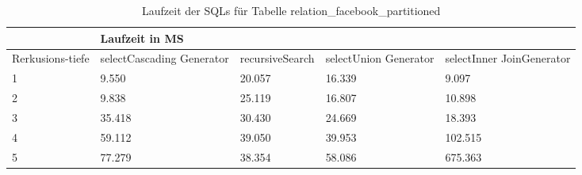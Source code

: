 \begin{table}[H]
	\centering
	\begin{tabular}{l|l|l|l|l|l|}
		\cline{2-6}
		& \multicolumn{5}{|l|}{Laufzeit in MS}                                                                                                                                                  \\ \hline
		\multicolumn{1}{|l|}{\multirow{2}{2cm}{Rerkusions-tiefe}} & \multicolumn{2}{|l|}{\multirow{2}{3cm}{selectCascading Generator}} & \multirow{2}{2.8cm}{recursiveSearch} & \multirow{2}{2.5cm}{selectUnion Generator} & \multirow{2}{2.5cm}{selectInner JoinGenerator} \\
		\multicolumn{1}{|l|}{}
		& \multicolumn{2}{|l|}{}                                           &                                  &                                     &                                           \\ \hline
		
\multicolumn{1}{|l|}{1}                                 & \multicolumn{2}{l|}{9.550}                                       & 20.057                                                & 16.339                                                    & 9.097                                                           \\ \hline
\multicolumn{1}{|l|}{2}                                 & \multicolumn{2}{l|}{9.838}                                       & 25.119                                                & 16.807                                                    & 10.898                                                          \\ \hline
\multicolumn{1}{|l|}{3}                                 & \multicolumn{2}{l|}{35.418}                                      & 30.430                                                & 24.669                                                    & 18.393                                                          \\ \hline
\multicolumn{1}{|l|}{4}                                 & \multicolumn{2}{l|}{59.112}                                      & 39.050                                                & 39.953                                                    & 102.515                                                         \\ \hline
\multicolumn{1}{|l|}{5}                                 & \multicolumn{2}{l|}{77.279}                                      & 38.354                                                & 58.086                                                    & 675.363                                                         \\ \hline

		
		
	\end{tabular}
	\caption{Laufzeit der SQLs für Tabelle relation\_facebook\_partitioned}
\end{table}

